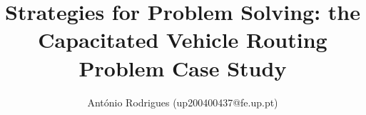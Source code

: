 \documentclass[english,journal]{IEEEtran}
\begin{document}
\title{Strategies for Problem Solving: the Capacitated Vehicle Routing 
        Problem Case Study}
\author{António Rodrigues (up200400437@fe.up.pt)}

\maketitle





%











\end{document}
